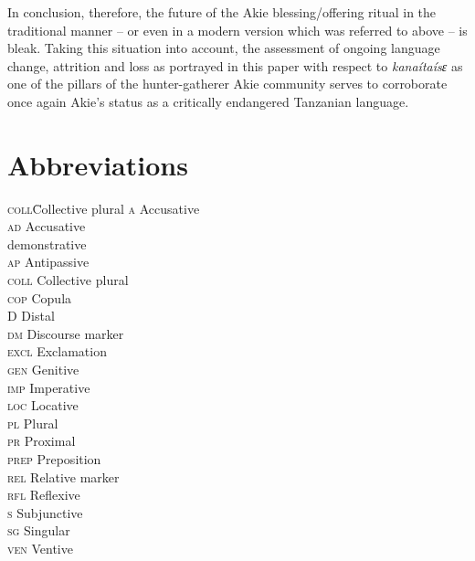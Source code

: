 \documentclass[output=paper,colorlinks,citecolor=brown]{langscibook}
\begin{document}
In conclusion, therefore, the future of the Akie blessing/offering ritual in the traditional manner – or even in a modern version which was referred to above -- is bleak. Taking this situation into account, the assessment of ongoing language change, attrition and loss as portrayed in this paper with respect to \textit{kanaítaísɛ} as one of the pillars of the hunter-gatherer Akie community serves to corroborate once again Akie’s status as a critically endangered Tanzanian language.


\section*{Abbreviations}

\begin{multicols}{3}
\begin{tabbing}
\textsc{coll}\hspace{1ex}\= Collective plural\kill
\textsc{a} \> Accusative\\
\textsc{ad} \> Accusative \\ \> demonstrative\\
\textsc{ap} \>  Antipassive\\
\textsc{coll} \> Collective plural\\
\textsc{cop} \> Copula\\
\textsc{D} \> Distal\\
\textsc{dm} \> Discourse marker\\ 
\textsc{excl} \> Exclamation\\ 
\textsc{gen} \> Genitive\\ 
\textsc{imp} \> Imperative\\ 
\textsc{loc} \> Locative\\
\textsc{pl} \> Plural\\
\textsc{pr} \> Proximal\\
\textsc{prep}  \> Preposition\\
\textsc{rel} \> Relative marker\\ 
\textsc{rfl} \> Reflexive\\ 
\textsc{s} \> Subjunctive\\
\textsc{sg} \> Singular\\
\textsc{ven} \> Ventive
\end{tabbing}
\end{multicols}
\end{document}
